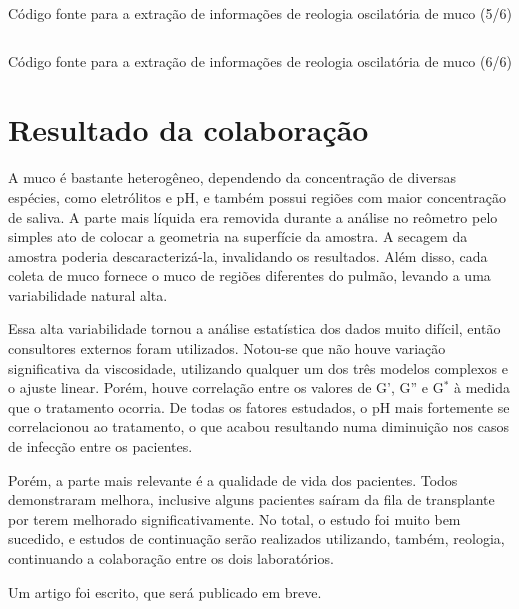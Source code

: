 		\begin{listing}[h]
			\inputminted{python}{./python/extracao_muco5.py}
			\caption{Código fonte para a extração de informações de reologia oscilatória de muco (5/6)}
			\label{lst:extracao_muco5}
		\end{listing}
		
		\begin{listing}[h]
			\inputminted{python}{./python/extracao_muco6.py}
			\caption{Código fonte para a extração de informações de reologia oscilatória de muco (6/6)} 
			\label{lst:extracao_muco6}
		\end{listing}
		
		\FloatBarrier
		
		\chapter{Resultado da colaboração}
		
		A muco é bastante heterogêneo, dependendo da concentração de diversas espécies, como eletrólitos e pH, e também possui regiões com maior concentração de saliva. A parte mais líquida era removida durante a análise no reômetro pelo simples ato de colocar a geometria na superfície da amostra. A secagem da amostra poderia descaracterizá-la, invalidando os resultados. Além disso, cada coleta de muco fornece o muco de regiões diferentes do pulmão, levando a uma variabilidade natural alta.
		
		Essa alta variabilidade tornou a análise estatística dos dados muito difícil, então consultores externos foram utilizados. Notou-se que não houve variação significativa da viscosidade, utilizando qualquer um dos três modelos complexos e o ajuste linear.  Porém, houve correlação entre os valores de G', G'' e G\(^*\) à medida que o tratamento ocorria. De todas os fatores estudados, o pH mais fortemente se correlacionou ao tratamento, o que acabou resultando numa diminuição nos casos de infecção entre os pacientes.
		
		Porém, a parte mais relevante é a qualidade de vida dos pacientes. Todos demonstraram melhora, inclusive alguns pacientes saíram da fila de transplante por terem melhorado significativamente. No total, o estudo foi muito bem sucedido, e estudos de continuação serão realizados utilizando, também, reologia, continuando a colaboração entre os dois laboratórios.
		
		Um artigo foi escrito, que será publicado em breve. %
		
